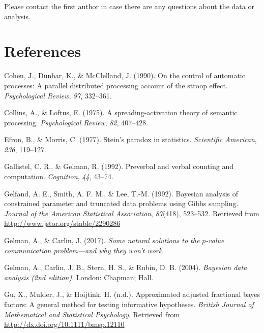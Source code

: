 \documentclass[english,,man]{apa6}
\begin{document}
Please contact the first author in case there are any questions about the data or analysis.

\newpage

\hypertarget{references}{%
\section{References}\label{references}}

\begingroup
\setlength{\parindent}{-0.5in}
\setlength{\leftskip}{0.5in}

\hypertarget{refs}{}
\leavevmode\hypertarget{ref-Cohen:etal:1990}{}%
Cohen, J., Dunbar, K., \& McClelland, J. (1990). On the control of automatic processes: A parallel distributed processing account of the stroop effect. \emph{Psychological Review}, \emph{97}, 332--361.

\leavevmode\hypertarget{ref-Collins:Loftus:1975}{}%
Collins, A., \& Loftus, E. (1975). A spreading-activation theory of semantic processing. \emph{Psychological Review}, \emph{82}, 407--428.

\leavevmode\hypertarget{ref-Efron:Morris:1977}{}%
Efron, B., \& Morris, C. (1977). Stein's paradox in statistics. \emph{Scientific American}, \emph{236}, 119--127.

\leavevmode\hypertarget{ref-Gallistel:Gelman:1992}{}%
Gallistel, C. R., \& Gelman, R. (1992). Preverbal and verbal counting and computation. \emph{Cognition}, \emph{44}, 43--74.

\leavevmode\hypertarget{ref-Gelfand:etal:1992}{}%
Gelfand, A. E., Smith, A. F. M., \& Lee, T.-M. (1992). Bayesian analysis of constrained parameter and truncated data problems using Gibbs sampling. \emph{Journal of the American Statistical Association}, \emph{87}(418), 523--532. Retrieved from \url{http://www.jstor.org/stable/2290286}

\leavevmode\hypertarget{ref-Gelman:Carlin:2017}{}%
Gelman, A., \& Carlin, J. (2017). \emph{Some natural solutions to the \(p\)-value communication problem---and why they won't work}.

\leavevmode\hypertarget{ref-Gelman:etal:2004}{}%
Gelman, A., Carlin, J. B., Stern, H. S., \& Rubin, D. B. (2004). \emph{Bayesian data analysis (2nd edition)}. London: Chapman; Hall.

\leavevmode\hypertarget{ref-Gu:etal:inpress}{}%
Gu, X., Mulder, J., \& Hoijtink, H. (n.d.). Approximated adjusted fractional bayes factors: A general method for testing informative hypotheses. \emph{British Journal of Mathematical and Statistical Psychology}. Retrieved from \url{http://dx.doi.org/10.1111/bmsp.12110}
\end{document}
